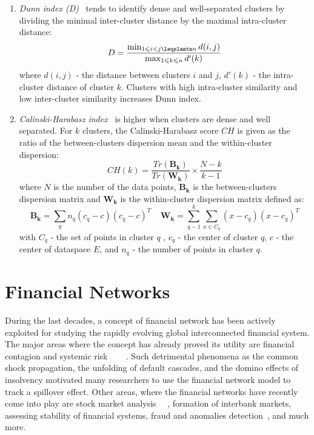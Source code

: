 \begin{enumerate}
  \item \textit{Dunn index (D)}~\cite{Dunn1973index} tends to identify dense and well-separated clusters by dividing the minimal inter-cluster distance by the maximal intra-cluster distance:
    \begin{equation}
        D = \frac{\min_{1\leqslant i < j \leqslantn n}d(i,j)}{\max_{1\leqslant k\leqslant n}d'(k)}
        \label{eq:equat22}
     \end{equation}  
    where $d(i,j)$ - the distance between clusters $i$ and $j$, $d'(k)$ - the intra-cluster distance of cluster $k$. Clusters with high intra-cluster similarity and low inter-cluster similarity increases Dunn index.
    
    \item \textit{Calinski-Harabasz index}~\cite{CH2007} is higher when clusters are dense and well separated. For $k$ clusters, the Calinski-Harabasz score $CH$ is given as the ratio of the between-clusters dispersion mean and the within-cluster dispersion:
        \begin{equation}
            CH(k) = \frac{Tr(\boldsymbol{B_k})}{Tr(\boldsymbol{W_k})} \times \frac{N-k}{k-1}
            \label{eq:equat23}
         \end{equation}
     where $N$ is the number of the data points, $\boldsymbol{B_k}$ is the between-clusters dispersion matrix and $\boldsymbol{W_k}$ is the within-cluster dispersion matrix defined as:
        \begin{equation}
            \boldsymbol{B_k} = \sum_q n_q(c_q-c)(c_q-c)^T\;\;\;\; \boldsymbol{W_k} = \sum_{q-1}^k \sum_{x \in C_q} (x-c_q)(x-c_q)^T
            \label{eq:equat24}
        \end{equation}
    with $C_q$ - the set of points in cluster $q$ , $c_q$ - the center of cluster $q$, $c$ - the center of dataspace $E$, and $n_q$ - the number of points in cluster $q$.
\end{enumerate}

\section{Financial Networks}
\label{Financial Networks}
During the last decades, a concept of financial network has been actively exploited for studying the rapidly evolving global interconnected financial system. The major areas where the concept has already proved its utility are financial contagion and systemic risk~\cite{ContagionFinNets} ~\cite{ResContagionFinNets} ~\cite{NetStrucSysRiskBankSys}. Such detrimental phenomena as the common shock propagation, the unfolding of default cascades, and the domino effects of insolvency motivated many researchers to use the financial network model to track a spillover effect. Other areas, where the financial networks have recently come into play are stock market analysis~\cite{NetAnalysisChineseStockMarket} ~\cite{StatisticAnalysisFinNetworks}, formation of interbank markets, assessing stability of financial systems, fraud and anomalies detection~\cite{AnomalyNetIntrusion}, and much more.

